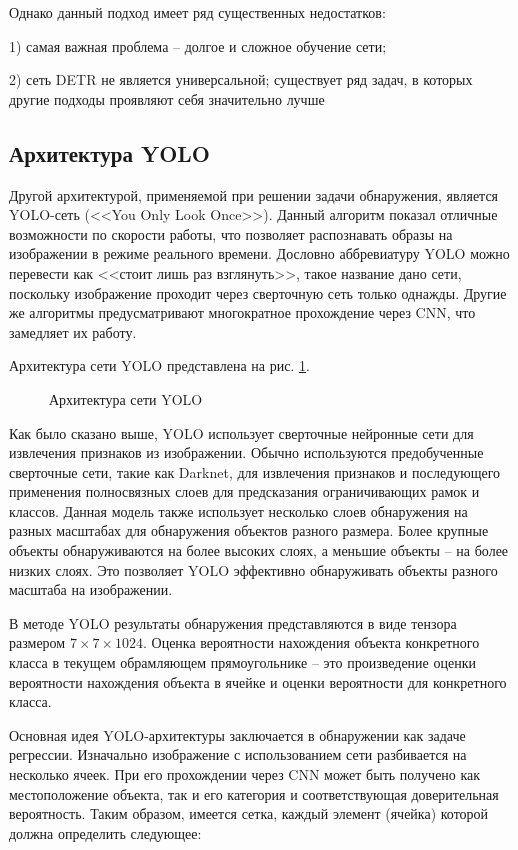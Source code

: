 \documentclass[14pt,a4paper]{extarticle}
\begin{document}
Однако данный подход имеет ряд существенных недостатков:

1) самая важная проблема -- долгое и сложное обучение сети;

2) сеть DETR не является универсальной; существует ряд задач, в которых другие подходы проявляют себя значительно лучше 

\newpage
\subsection{Архитектура YOLO}
Другой архитектурой, применяемой при решении задачи обнаружения, является YOLO-сеть (<<You Only Look Once>>). Данный алгоритм показал отличные возможности по скорости работы, что позволяет распознавать образы на изображении в режиме реального времени. Дословно аббревиатуру YOLO можно перевести как <<стоит лишь раз взглянуть>>, такое название дано сети, поскольку изображение проходит через сверточную сеть только однажды. Другие же алгоритмы предусматривают многократное прохождение через CNN, что замедляет их работу. 

Архитектура сети YOLO представлена на рис. \ref{yolo}.
\begin{figure}[h]
\caption{Архитектура сети YOLO} \label{yolo}
\end{figure}

Как было сказано выше, YOLO использует сверточные нейронные сети для извлечения признаков из изображении. Обычно используются предобученные сверточные сети, такие как Darknet, для извлечения признаков и последующего применения полносвязных слоев для предсказания ограничивающих рамок и классов. Данная модель также использует несколько слоев обнаружения на разных масштабах для обнаружения объектов разного размера. Более крупные объекты обнаруживаются на более высоких слоях, а меньшие объекты -- на более низких слоях. Это позволяет YOLO эффективно обнаруживать объекты разного масштаба на изображении.

В методе YOLO результаты обнаружения представляются в виде тензора размером $7\times 7 \times 1024$. Оценка вероятности нахождения объекта конкретного класса в
текущем обрамляющем прямоугольнике -- это произведение оценки вероятности нахождения объекта в ячейке и оценки вероятности для конкретного класса.


Основная идея YOLO-архитектуры заключается в обнаружении как задаче регрессии. Изначально изображение с использованием сети разбивается на несколько ячеек. При его прохождении через CNN может быть получено как местоположение объекта, так и его категория и соответствующая доверительная вероятность. Таким образом, имеется сетка, каждый элемент (ячейка) которой должна определить следующее:
\end{document}
